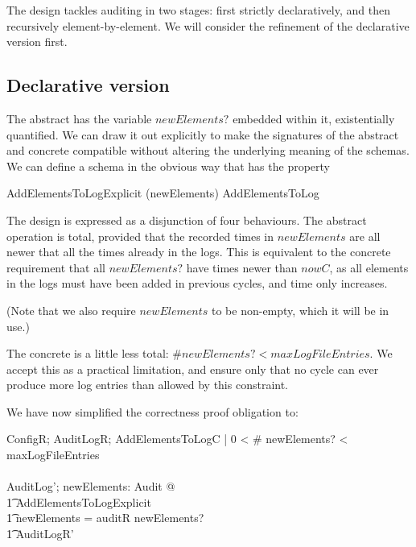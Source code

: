 The design tackles auditing in two stages:
first strictly declaratively,
and then recursively element-by-element.
We will consider the refinement of the declarative version first.

\subsection{Declarative version}
\label{refine:decl}
The abstract has the variable $newElements?$ embedded within it,
existentially quantified.
We can draw it out explicitly to make the signatures of the abstract and concrete compatible
without altering the underlying meaning of the schemas.
We can define a schema in the obvious way that has the property
\begin{argue}
	AddElementsToLogExplicit \hide (newElements) \equiv AddElementsToLog
\end{argue}

The design is expressed as a disjunction of four behaviours.
The abstract operation is total,
provided that the recorded times in $newElements$
are all newer that all the times already in the logs.
This is equivalent to the concrete requirement that all $newElements?$
have times newer than $nowC$,
as all elements in the logs must have been added in previous cycles,
and time only increases.

(Note that we also require $newElements$ to be non-empty, which it will be in use.)

The concrete is a little less total:
$\# newElements? < maxLogFileEntries$.
We accept this as a practical limitation,
and ensure only that no cycle can ever produce more log entries than allowed by this constraint.

We have now simplified the correctness proof obligation to:

\begin{zed}
ConfigR; AuditLogR; AddElementsToLogC |
0 < \# newElements? < maxLogFileEntries
\\ \shows
\\ \exists AuditLog'; newElements: \finset Audit @ 
\\ \t1	AddElementsToLogExplicit
\\ \t1	\land newElements = auditR \limg newElements? \rimg
\\ \t1	\land AuditLogR'
\end{zed}

